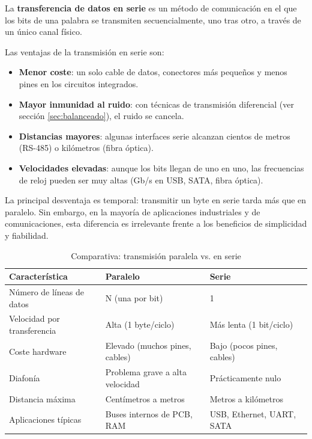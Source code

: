 \begin{definicion}
La \textbf{transferencia de datos en serie} es un método de comunicación en el que los bits de una palabra se transmiten secuencialmente, uno tras otro, a través de un único canal físico.
\end{definicion}

Las ventajas de la transmisión en serie son:
\begin{itemize}
    \item \textbf{Menor coste}: un solo cable de datos, conectores más pequeños y menos pines en los circuitos integrados.
    \item \textbf{Mayor inmunidad al ruido}: con técnicas de transmisión diferencial (ver sección \ref{sec:balanceado}), el ruido se cancela.
    \item \textbf{Distancias mayores}: algunas interfaces serie alcanzan cientos de metros (RS-485) o kilómetros (fibra óptica).
    \item \textbf{Velocidades elevadas}: aunque los bits llegan de uno en uno, las frecuencias de reloj pueden ser muy altas (Gb/s en USB, SATA, fibra óptica).
\end{itemize}

La principal desventaja es temporal: transmitir un byte en serie tarda más que en paralelo. Sin embargo, en la mayoría de aplicaciones industriales y de comunicaciones, esta diferencia es irrelevante frente a los beneficios de simplicidad y fiabilidad.

\begin{table}[htbp]
\centering
\small
\caption{Comparativa: transmisión paralela vs. en serie}
\begin{tabularx}{\textwidth}{@{}lXX@{}}
\toprule
\textbf{Característica} & \textbf{Paralelo} & \textbf{Serie} \\
\midrule
Número de líneas de datos & N (una por bit) & 1 \\
Velocidad por transferencia & Alta (1 byte/ciclo) & Más lenta (1 bit/ciclo) \\
Coste hardware & Elevado (muchos pines, cables) & Bajo (pocos pines, cables) \\
Diafonía & Problema grave a alta velocidad & Prácticamente nulo \\
Distancia máxima & Centímetros a metros & Metros a kilómetros \\
Aplicaciones típicas & Buses internos de PCB, RAM & USB, Ethernet, UART, SATA \\
\bottomrule
\end{tabularx}
\end{table}


